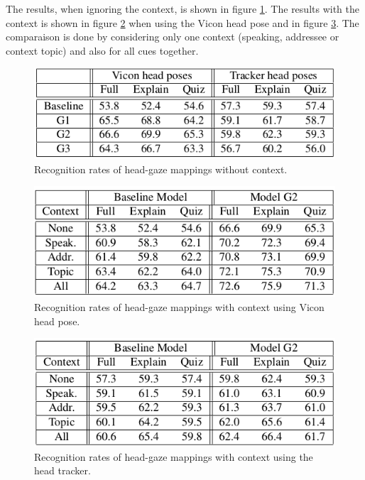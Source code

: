 \documentclass[11pt,a4paper]{article}
\begin{document}
The results, when ignoring the context, is shown in figure \ref{ResultsNoContextSheikhi}. The results with the context is shown in figure \ref{ViconResultsContextSheikhi} when using the Vicon head pose and in figure \ref{TrackerResultsContextSheikhi}. The comparaison is done by considering only one context (speaking, addressee or context topic) and also for all cues together. 

\begin{figure}[!h]
\centering
\includegraphics[scale=0.6]{./Pictures/ResultsNoContextSheikhi.png}
\caption{Recognition rates of head-gaze mappings without context. \label{ResultsNoContextSheikhi}}
\end{figure}

\begin{figure}[!h]
\centering
\includegraphics[scale=0.6]{./Pictures/ViconResultsContextSheikhi.png}
\caption{Recognition rates of head-gaze mappings with context using Vicon head pose. \label{ViconResultsContextSheikhi}}
\end{figure}

\begin{figure}[!h]
\centering
\includegraphics[scale=0.6]{./Pictures/TrackerResultsContextSheikhi.png}
\caption{Recognition rates of head-gaze mappings with context using the head tracker. \label{TrackerResultsContextSheikhi}}
\end{figure}
\end{document}
